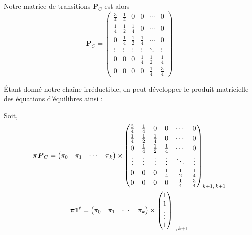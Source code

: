 \documentclass{article}
\begin{document}
    \vspace{.2cm}
    Notre matrice de transitions $\boldsymbol{P}_C$ est alors 
    \[
        \boldsymbol{P}_C = \begin{pmatrix} 
            \frac{3}{4} & \frac{1}{4} & 0 & 0 & \cdots & 0 \\[.5ex]
            \frac{1}{4} & \frac{1}{2} & \frac{1}{4} & 0 & \cdots & 0 \\[.5ex] 
            0 & \frac{1}{4} & \frac{1}{2} & \frac{1}{4} & \cdots & 0 \\[.5ex] 
            \vdots & \vdots & \vdots & \vdots & \ddots & \vdots \\[.5ex] 
             0 & 0 & 0 & \frac{1}{4} & \frac{1}{2} & \frac{1}{4} \\[.5ex] 
             0 & 0 & 0 & 0 & \frac{1}{4} & \frac{3}{4}
        \end{pmatrix}
    \]

    \vspace{.3cm}
    Étant donné notre chaîne irréductible, on peut développer le produit matricielle des équations d'équilibres ainsi :

    \vspace{.2cm}
    Soit,
    \begin{gather}
        \boldsymbol{\pi}\boldsymbol{P}_C = \begin{pmatrix}
            \pi_0 & \pi_1 & \cdots & \pi_k
        \end{pmatrix}
        \times
        \begin{pmatrix}
            \frac{3}{4} & \frac{1}{4} & 0 & 0 & \cdots & 0 \\[.5ex]
            \frac{1}{4} & \frac{1}{2} & \frac{1}{4} & 0 & \cdots & 0 \\[.5ex] 
            0 & \frac{1}{4} & \frac{1}{2} & \frac{1}{4} & \cdots & 0 \\[.5ex] 
            \vdots & \vdots & \vdots & \vdots & \ddots & \vdots \\[.5ex] 
             0 & 0 & 0 & \frac{1}{4} & \frac{1}{2} & \frac{1}{4} \\[.5ex] 
             0 & 0 & 0 & 0 & \frac{1}{4} & \frac{3}{4}
        \end{pmatrix}_{k+1,\, k+1} \notag \\ \boldsymbol{\pi}\boldsymbol{1}^t = \begin{pmatrix}
            \pi_0 & \pi_1 & \cdots & \pi_k
        \end{pmatrix}
        \times
        \begin{pmatrix}
            1 \\
            1 \\
            \vdots \\
            1
        \end{pmatrix}_{1,\, k+1} \notag
    \end{gather}
\end{document}
